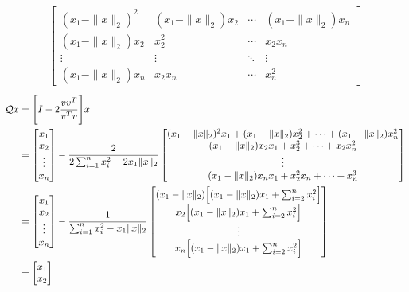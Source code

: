 \documentclass{article}
\newcommand{\twonorm}[1]{\| #1 \|_2}
\begin{document}
\begin{enumerate}
{\begin{align*}
\begin{bmatrix}
        (x_1 - \twonorm{x})^2 & (x_1 - \twonorm{x})x_2 & \cdots & (x_1 - \twonorm{x})x_n \\
        (x_1 - \twonorm{x})x_2 & x_2^2 & \cdots & x_2x_n \\
        \vdots  & \vdots  & \ddots & \vdots  \\
        (x_1 - \twonorm{x})x_n & x_2x_n & \cdots & x_n^2 
    \end{bmatrix}
  \end{align*}
  \begin{align*}
      \calQ x &= \Bigg[I - 2 \frac{vv^T}{v^Tv} \Bigg] x \\
      &= 
      \begin{bmatrix}
        x_1 \\
        x_2 \\
        \vdots \\
        x_n
      \end{bmatrix}
     - \frac{2}{2\sum_{i=1}^{n}x_i^2 - 2x_1\twonorm{x}}
     \begin{bmatrix}
        (x_1 - \twonorm{x})^2x_1 + (x_1 - \twonorm{x})x_2^2 + \cdots + (x_1 - \twonorm{x})x_n^2 \\
        (x_1 - \twonorm{x})x_2x_1 + x_2^3 + \cdots + x_2x_n^2 \\
        \vdots \\
        (x_1 - \twonorm{x})x_nx_1 + x_2^2x_n + \cdots + x_n^3 
    \end{bmatrix} \\
      &= 
      \begin{bmatrix}
        x_1 \\
        x_2 \\
        \vdots \\
        x_n
      \end{bmatrix}
     - \frac{1}{\sum_{i=1}^{n}x_i^2 - x_1\twonorm{x}}
     \begin{bmatrix}
        (x_1 - \twonorm{x}) \Big[ (x_1 - \twonorm{x})x_1 + \sum_{i=2}^{n}x_i^2 \Big] \\
        x_2 \Big[ (x_1 - \twonorm{x})x_1 + \sum_{i=2}^{n}x_i^2 \Big]\\
        \vdots  \\
        x_n \Big[ (x_1 - \twonorm{x})x_1 + \sum_{i=2}^{n}x_i^2 \Big] 
    \end{bmatrix} \\
      &= 
      \begin{bmatrix}
        x_1 \\
        x_2 \\

\end{bmatrix}
\end{align*}}
\end{enumerate}
\end{document}
